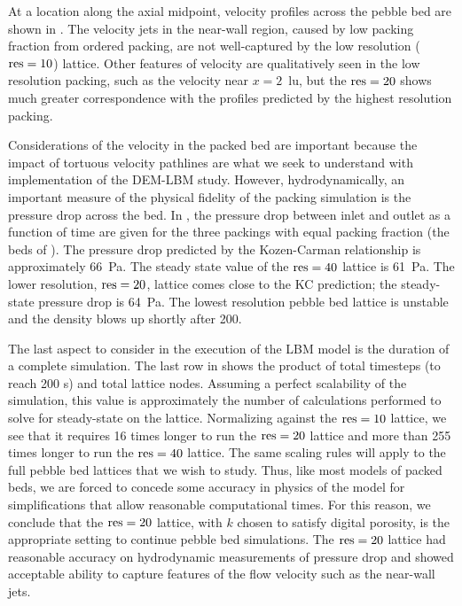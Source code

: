 At a location along the axial midpoint, velocity profiles across the pebble bed are shown in . The velocity jets in the near-wall region, caused by low packing fraction from ordered packing, are not well-captured by the low resolution ($\text{res} = 10$) lattice. Other features of velocity are qualitatively seen in the low resolution packing, such as the velocity near $x = 2$~lu, but the $\text{res}=20$ shows much greater correspondence with the profiles predicted by the highest resolution packing. 

Considerations of the velocity in the packed bed are important because the impact of tortuous velocity pathlines are what we seek to understand with implementation of the DEM-LBM study. However, hydrodynamically, an important measure of the physical fidelity of the packing simulation is the pressure drop across the bed. In , the pressure drop between inlet and outlet as a function of time are given for the three packings with equal packing fraction (the beds of ). The pressure drop predicted by the Kozen-Carman relationship is approximately \SI{66}{\pascal}. The steady state value of the $\text{res}=40$ lattice is \SI{61}{\pascal}. The lower resolution, $\text{res}=20$, lattice comes close to the KC prediction; the steady-state pressure drop is \SI{64}{\pascal}. The lowest resolution pebble bed lattice is unstable and the density blows up shortly after \SI{200}{\sec}.

The last aspect to consider in the execution of the LBM model is the duration of a complete simulation. The last row in  shows the product of total timesteps (to reach 200 s) and total lattice nodes. Assuming a perfect scalability of the simulation, this value is approximately the number of calculations performed to solve for steady-state on the lattice. Normalizing against the $\text{res}=10$ lattice, we see that it requires 16 times longer to run the $\text{res} =20$ lattice and more than 255 times longer to run the $\text{res} = 40$ lattice. The same scaling rules will apply to the full pebble bed lattices that we wish to study. Thus, like most models of packed beds, we are forced to concede some accuracy in physics of the model for simplifications that allow reasonable computational times. For this reason, we conclude that the $\text{res} = 20$ lattice, with $k$ chosen to satisfy digital porosity, is the appropriate setting to continue pebble bed simulations. The $\text{res} = 20$ lattice had reasonable accuracy on hydrodynamic measurements of pressure drop and showed acceptable ability to capture features of the flow velocity such as the near-wall jets.

